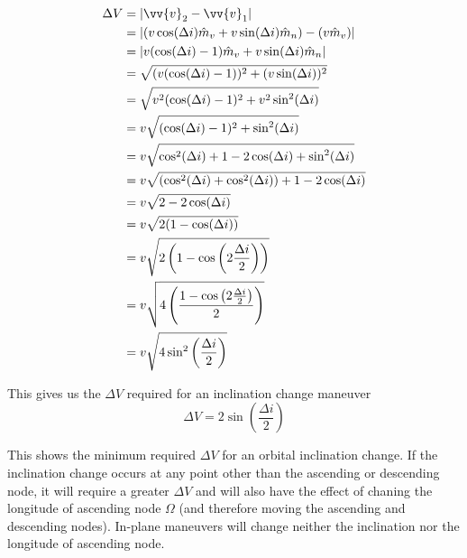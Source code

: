 \documentclass{article}
\begin{document}
\begin{align*}
    \Delta V & = |\vv{v}_2-\vv{v}_1|                                                    \\
             & = |(v\cos(\Delta i)\hat{m}_v+v\sin(\Delta i)\hat{m}_n)-(v\hat{m}_v)|     \\
             & = |v(\cos(\Delta i)-1)\hat{m}_v+v\sin(\Delta i)\hat{m}_n|                \\
             & = \sqrt{(v(\cos(\Delta i)-1))^2+(v\sin(\Delta i))^2}                     \\
             & = \sqrt{v^2(\cos(\Delta i)-1)^2+v^2\sin^2(\Delta i)}                     \\
             & = v\sqrt{(\cos(\Delta i)-1)^2+\sin^2(\Delta i)}                          \\
             & = v\sqrt{\cos^2(\Delta i)+1-2\cos(\Delta i)+\sin^2(\Delta i)}            \\
             & = v\sqrt{(\cos^2(\Delta i)+\cos^2(\Delta i))+1-2\cos(\Delta i)}          \\
             & = v\sqrt{2-2\cos(\Delta i)}                                              \\
             & = v\sqrt{2(1-\cos(\Delta i))}                                            \\
             & = v\sqrt{2\left(1-\cos\left(2\frac{\Delta i}{2}\right)\right)}           \\
             & = v\sqrt{4\left(\frac{1-\cos\left(2\frac{\Delta i}{2}\right)}{2}\right)} \\
             & = v\sqrt{4\sin^2\left(\frac{\Delta i}{2}\right)}                         \\
\end{align*}

This gives us the $\Delta V$ required for an inclination change maneuver
\begin{equation}
    \Delta V= 2\sin\left(\frac{\Delta i}{2}\right)
\end{equation}

This shows the minimum required $\Delta V$ for an orbital inclination change. If the inclination change occurs at any point other than the ascending or descending node, it will require a greater $\Delta V$ and will also have the effect of chaning the longitude of ascending node $\Omega$ (and therefore moving the ascending and descending nodes). In-plane maneuvers will change neither the inclination nor the longitude of ascending node.
\end{document}
